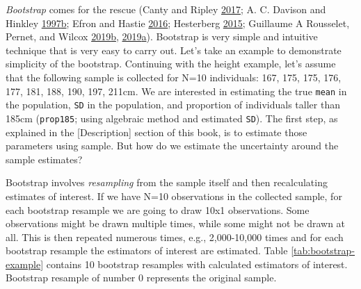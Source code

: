 \documentclass[
]{book}
\begin{document}
\emph{Bootstrap} comes for the rescue (Canty and Ripley \protect\hyperlink{ref-cantyBootBootstrapSPlus2017}{2017}; A. C. Davison and Hinkley \protect\hyperlink{ref-davisonBootstrapMethodsTheir1997}{1997}\protect\hyperlink{ref-davisonBootstrapMethodsTheir1997}{b}; Efron and Hastie \protect\hyperlink{ref-efronComputerAgeStatistical2016}{2016}; Hesterberg \protect\hyperlink{ref-hesterbergWhatTeachersShould2015}{2015}; Guillaume A Rousselet, Pernet, and Wilcox \protect\hyperlink{ref-rousseletPercentileBootstrapTeaser2019}{2019}\protect\hyperlink{ref-rousseletPercentileBootstrapTeaser2019}{b}, \protect\hyperlink{ref-rousseletPracticalIntroductionBootstrap2019}{2019}\protect\hyperlink{ref-rousseletPracticalIntroductionBootstrap2019}{a}). Bootstrap is very simple and intuitive technique that is very easy to carry out. Let's take an example to demonstrate simplicity of the bootstrap. Continuing with the height example, let's assume that the following sample is collected for N=10 individuals: 167, 175, 175, 176, 177, 181, 188, 190, 197, 211cm. We are interested in estimating the true \texttt{mean} in the population, \texttt{SD} in the population, and proportion of individuals taller than 185cm (\texttt{prop185}; using algebraic method and estimated \texttt{SD}). The first step, as explained in the {[}Description{]} section of this book, is to estimate those parameters using sample. But how do we estimate the uncertainty around the sample estimates?

Bootstrap involves \emph{resampling} from the sample itself and then recalculating estimates of interest. If we have N=10 observations in the collected sample, for each bootstrap resample we are going to draw 10x1 observations. Some observations might be drawn multiple times, while some might not be drawn at all. This is then repeated numerous times, e.g., 2,000-10,000 times and for each bootstrap resample the estimators of interest are estimated. Table \ref{tab:bootstrap-example} contains 10 bootstrap resamples with calculated estimators of interest. Bootstrap resample of number 0 represents the original sample.
\end{document}
